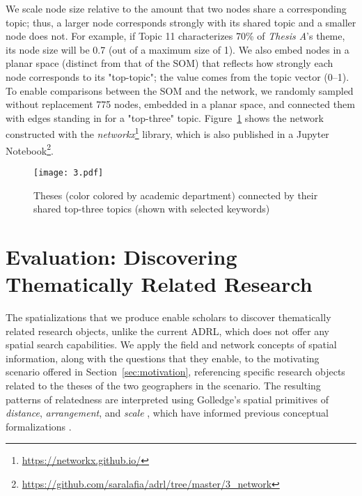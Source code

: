 \documentclass[a4paper,UKenglish]{lipics-v2018}
\begin{document}
We scale node size relative to the amount that two nodes share a corresponding topic; thus, a larger node corresponds strongly with its shared topic and a smaller node does not. For example, if Topic 11 characterizes 70\% of \textit{Thesis A}'s theme, its node size will be 0.7 (out of a maximum size of 1). We also embed nodes in a planar space (distinct from that of the SOM) that reflects how strongly each node corresponds to its "top-topic"; the value comes from the topic vector (0--1). 
To enable comparisons between the SOM and the network, we randomly sampled without replacement 775 nodes, embedded in a planar space, and connected them with edges standing in for a "top-three" topic. Figure~\ref{fig:network} shows the network constructed with the \textit{networkx}\footnote{\url{https://networkx.github.io/}} library, which is also published in a Jupyter Notebook\footnote{\url{https://github.com/saralafia/adrl/tree/master/3_network}}.

\begin{figure}[ht]
    \centering
    \texttt{[image: 3.pdf]}
    \caption{Theses (color colored by academic department) connected by their shared top-three topics (shown with selected keywords)}
    \label{fig:network}
\end{figure}

\section{Evaluation: Discovering Thematically Related Research}
The spatializations that we produce enable scholars to discover thematically related research objects, unlike the current ADRL, which does not offer any spatial search capabilities. We apply the field and network concepts of spatial information, along with the questions that they enable, to the motivating scenario offered in Section~\ref{sec:motivation},  referencing specific research objects related to the theses of the two geographers in the scenario. 
The resulting patterns of relatedness are interpreted using Golledge’s spatial primitives of \textit{distance}, \textit{arrangement}, and \textit{scale} \cite{Golledge1995a}, which have informed previous conceptual formalizations \cite{Fabrikant2000b}. 
\end{document}

